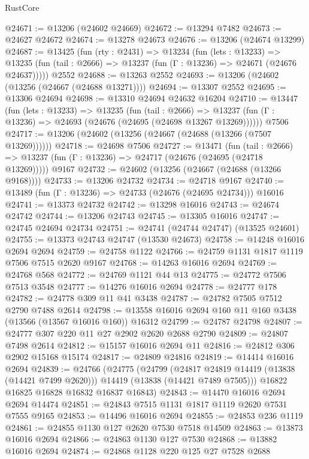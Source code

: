 \begin{lexlean}{RustCore}
\begin{coremodule}
@24671 := @13206 (@24602 @24669)
@24672 := @13294 @7482
@24673 := @24627 @24672
@24674 := @13278 @24673
@24676 := @13206 (@24674 @13299)
@24687 := @13425
    (fun (rty : @2431) =>
    @13234
      (fun (lets : @13233) =>
      @13235 (fun (tail : @2666) => @13237 (fun (Γ : @13236) => @24671 (@24676 @24637)))))
    @2552
@24688 := @13263 @2552
@24693 := @13206 (@24602 (@13256 (@24667 (@24688 @13271))))
@24694 := @13307 @2552
@24695 := @13306 @24694
@24698 := @13310 @24694 @24632 @16204
@24710 := @13447
    (fun (lets : @13233) =>
    @13235
      (fun (tail : @2666) =>
      @13237 (fun (Γ : @13236) => @24693 (@24676 (@24695 (@24698 @13267 @13269))))))
    @7506
@24717 := @13206 (@24602 (@13256 (@24667 (@24688 (@13266 (@7507 @13269))))))
@24718 := @24698 @7506
@24727 := @13471
    (fun (tail : @2666) => @13237 (fun (Γ : @13236) => @24717 (@24676 (@24695 (@24718 @13269)))))
    @9167
@24732 := @24602 (@13256 (@24667 (@24688 (@13266 @9168))))
@24733 := @13206 @24732
@24734 := @24718 @9167
@24740 := @13489 (fun (Γ : @13236) => @24733 (@24676 (@24695 @24734))) @16016
@24741 := @13373 @24732
@24742 := @13298 @16016
@24743 := @24674 @24742
@24744 := @13206 @24743
@24745 := @13305 @16016
@24747 := @24745 @24694 @24734
@24751 := @24741 (@24744 @24747) (@13525 @24601)
@24755 := @13373 @24743 @24747 (@13530 @24673)
@24758 := @14248 @16016 @2694 @2694
@24759 := @24758 @1122
@24766 := @24759 @1131 @1817 @1119 @7506 @7515 @2620 @9167
@24768 := @14263 @16016 @2694
@24769 := @24768 @568
@24772 := @24769 @1121 @44 @13
@24775 := @24772 @7506 @7513 @3548
@24777 := @14276 @16016 @2694
@24778 := @24777 @178
@24782 := @24778 @309 @11 @41 @3438
@24787 := @24782 @7505 @7512 @2790 @7488 @2614
@24798 := @13558 @16016 @2694 @160 @11 @160 @3438 (@13566 (@13567 @16016 @160)) @16312
@24799 := @24787 @24798
@24807 := @24777 @307 @220 @11 @27 @2902 @2620 @2688 @2790
@24809 := @24807 @7498 @2614
@24812 := @15157 @16016 @2694 @11
@24816 := @24812 @306 @2902 @15168 @15174
@24817 := @24809 @24816
@24819 := @14414 @16016 @2694
@24839 := @24766
    (@24775
      (@24799
        (@24817 @24819 @14419 (@13838 (@14421 @7499 @2620)))
        @14419
        (@13838 (@14421 @7489 @7505)))
      @16822
      @16825
      @16828
      @16832
      @16837
      @16843)
@24843 := @14470 @16016 @2694 @2694 @14474
@24851 := @24843 @7515 @1131 @1817 @1119 @2620 @7531 @7555 @9165
@24853 := @14496 @16016 @2694
@24855 := @24853 @236 @1119
@24861 := @24855 @1130 @127 @2620 @7530 @7518 @14509
@24863 := @13873 @16016 @2694
@24866 := @24863 @1130 @127 @7530
@24868 := @13882 @16016 @2694
@24874 := @24868 @1128 @220 @125 @27 @7528 @2688

\end{coremodule}
\end{lexlean}
